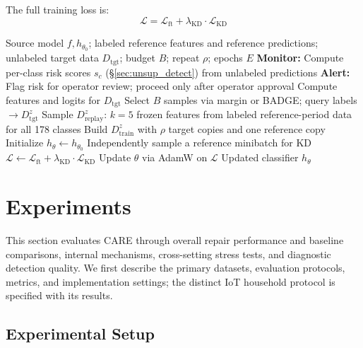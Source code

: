 \documentclass[journal]{IEEEtran}
\newcommand{\ours}{CARE}  %
\begin{document}
The full training loss is:
\begin{equation}
  \mathcal{L} = \mathcal{L}_{\text{ft}} + \lambda_{\text{KD}} \cdot \mathcal{L}_{\text{KD}}
\end{equation}

\begin{algorithm}[t]
\caption{\ours{}: Collapse-Aware Repair}
\label{alg:care}
\begin{algorithmic}[1]
\REQUIRE Source model $f, h_{\theta_0}$; labeled reference features and reference predictions; unlabeled target data $D_{\text{tgt}}$; budget $B$; repeat $\rho$; epochs $E$
\STATE \textbf{Monitor:} Compute per-class risk scores $s_c$ (\S\ref{sec:unsup_detect}) from unlabeled predictions
\STATE \textbf{Alert:} Flag risk for operator review; proceed only after operator approval
\STATE Compute features and logits for $D_{\text{tgt}}$
\STATE Select $B$ samples via margin or BADGE; query labels $\to D_{\text{tgt}}^z$
\STATE Sample $D_{\text{replay}}^z$: $k{=}5$ frozen features from labeled reference-period data for all 178 classes
\STATE Build $D_{\text{train}}^z$ with $\rho$ target copies and one reference copy
\STATE Initialize $h_\theta \leftarrow h_{\theta_0}$
    \STATE Independently sample a reference minibatch for KD
    \STATE $\mathcal{L} \leftarrow \mathcal{L}_{\text{ft}} + \lambda_{\text{KD}} \cdot \mathcal{L}_{\text{KD}}$
    \STATE Update $\theta$ via AdamW on $\mathcal{L}$
  \ENDFOR
\ENDFOR
\RETURN Updated classifier $h_\theta$
\end{algorithmic}
\end{algorithm}


\section{Experiments}
\label{sec:experiments}

This section evaluates \ours{} through overall repair performance and baseline comparisons, internal mechanisms, cross-setting stress tests, and diagnostic detection quality. We first describe the primary datasets, evaluation protocols, metrics, and implementation settings; the distinct IoT household protocol is specified with its results.

\subsection{Experimental Setup}
\label{sec:exp_setup}
\end{document}
